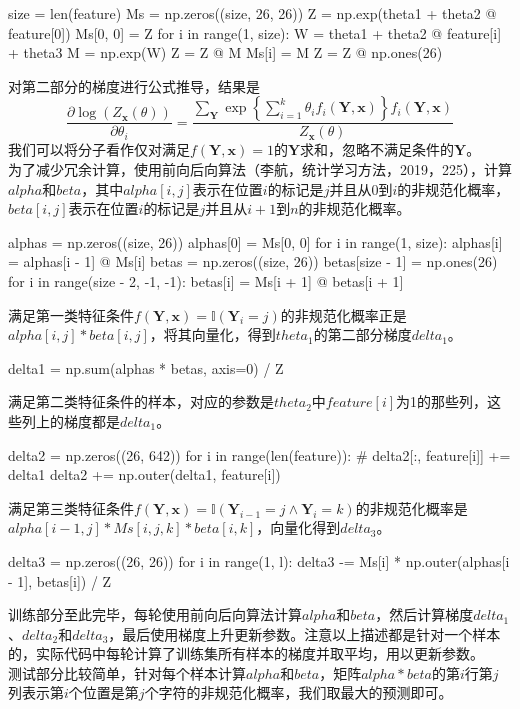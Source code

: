 \documentclass[a4paper,UTF8]{article}
\numberwithin{equation}{section}
\begin{document}
\begin{python}
size = len(feature)
Ms = np.zeros((size, 26, 26))
Z = np.exp(theta1 + theta2 @ feature[0])
Ms[0, 0] = Z
for i in range(1, size):
    W = theta1 + theta2 @ feature[i] + theta3
    M = np.exp(W)
    Z = Z @ M
    Ms[i] = M
Z = Z @ np.ones(26)
\end{python}
对第二部分的梯度进行公式推导，结果是
\[\frac{\partial\log\left(Z_{\mathbf{x}}(\theta)\right)}{\partial\theta_i} = \frac{\sum_{\mathbf{Y}} \exp \left\{\sum_{i=1}^{k} \theta_{i} f_{i}\left(\mathbf{Y}, \mathbf{x}\right)\right\}f_{i}\left(\mathbf{Y}, \mathbf{x}\right)}{Z_{\mathbf{x}}(\theta)}\]
我们可以将分子看作仅对满足$f\left(\mathbf{Y}, \mathbf{x}\right)=1$的$\mathbf{Y}$求和，忽略不满足条件的$\mathbf{Y}$。\\
为了减少冗余计算，使用前向后向算法（李航，统计学习方法，2019，225），计算$alpha$和$beta$，其中$alpha[i, j]$表示在位置$i$的标记是$j$并且从$0$到$i$的非规范化概率，$beta[i, j]$表示在位置$i$的标记是$j$并且从$i+1$到$n$的非规范化概率。
\begin{python}
alphas = np.zeros((size, 26))
alphas[0] = Ms[0, 0]
for i in range(1, size):
    alphas[i] = alphas[i - 1] @ Ms[i]
betas = np.zeros((size, 26))
betas[size - 1] = np.ones(26)
for i in range(size - 2, -1, -1):
    betas[i] = Ms[i + 1] @ betas[i + 1]
\end{python}
满足第一类特征条件$f\left(\mathbf{Y}, \mathbf{x}\right)=\mathbb{I}(\mathbf{Y}_i=j)$的非规范化概率正是$alpha[i, j] * beta[i, j]$，将其向量化，得到$theta_1$的第二部分梯度$delta_1$。
\begin{python}
delta1 = np.sum(alphas * betas, axis=0) / Z
\end{python}
满足第二类特征条件的样本，对应的参数是$theta_2$中$feature[i]$为1的那些列，这些列上的梯度都是$delta_1$。
\begin{python}
delta2 = np.zeros((26, 642))
for i in range(len(feature)):
    # delta2[:, feature[i]] += delta1
    delta2 += np.outer(delta1, feature[i])
\end{python}
满足第三类特征条件$f\left(\mathbf{Y}, \mathbf{x}\right)=\mathbb{I}(\mathbf{Y}_{i-1}=j\land\mathbf{Y}_i=k)$的非规范化概率是$alpha[i-1, j] * Ms[i, j, k] * beta[i, k]$，向量化得到$delta_3$。
\begin{python}
delta3 = np.zeros((26, 26))
for i in range(1, l):
    delta3 -= Ms[i] * np.outer(alphas[i - 1], betas[i]) / Z
\end{python}
训练部分至此完毕，每轮使用前向后向算法计算$alpha$和$beta$，然后计算梯度$delta_1$、$delta_2$和$delta_3$，最后使用梯度上升更新参数。注意以上描述都是针对一个样本的，实际代码中每轮计算了训练集所有样本的梯度并取平均，用以更新参数。\\
测试部分比较简单，针对每个样本计算$alpha$和$beta$，矩阵$alpha*beta$的第$i$行第$j$列表示第$i$个位置是第$j$个字符的非规范化概率，我们取最大的预测即可。
\end{document}
